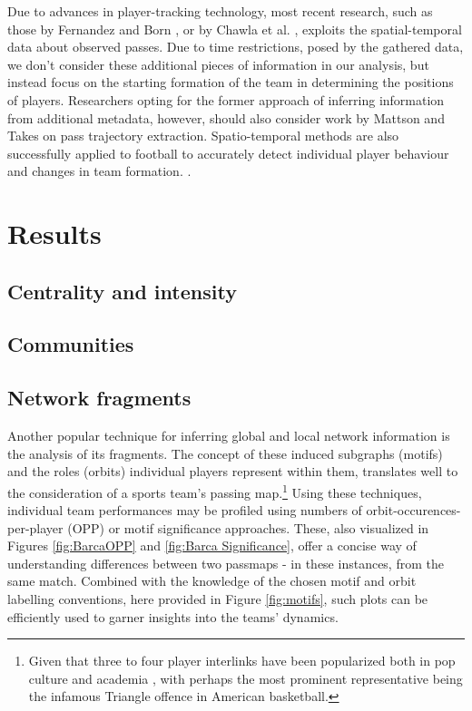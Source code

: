 \documentclass[9pt,twocolumn,twoside]{pnas-report}
\begin{document}
Due to advances in player-tracking technology, most recent research, such as those by Fernandez and Born \cite{fbrn}, or by Chawla et al. \cite{chawla}, exploits the spatial-temporal data about observed passes. Due to time restrictions, posed by the gathered data, we don't consider these additional pieces of information in our analysis, but instead focus on the starting formation of the team in determining the positions of players. Researchers opting for the former approach of inferring information from additional metadata, however, should also consider work by Mattson and Takes \cite{trajectory} on pass trajectory extraction. Spatio-temporal methods are also successfully applied to football to accurately detect individual player behaviour and changes in team formation. \cite{bialkowski2014large}.

\section*{Results}

\subsection*{Centrality and intensity}

\subsection*{Communities}
\subsection*{Network fragments}
Another popular technique for inferring global and local network information is the analysis of its fragments. The concept of these induced subgraphs (motifs) and the roles (orbits) individual players represent within them, translates well to the consideration of a sports team's passing map.\footnote{Given that three to four player interlinks have been popularized both in pop culture and academia \cite{triangle}, with perhaps the most prominent representative being the infamous Triangle offence in American basketball.}  Using these techniques, individual team performances may be profiled using numbers of orbit-occurences-per-player (OPP) or motif significance approaches. These, also visualized in Figures \ref{fig:BarcaOPP} and \ref{fig:Barca Significance}, offer a concise way of understanding differences between two passmaps - in these instances, from the same match. Combined with the knowledge of the chosen motif and orbit labelling conventions, here provided in Figure \ref{fig:motifs}, such plots can be efficiently used to garner insights into the teams' dynamics. 
\end{document}
